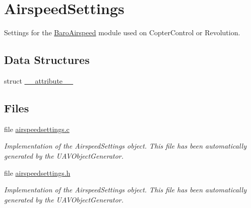 \hypertarget{group___airspeed_settings}{\section{\-Airspeed\-Settings}
\label{group___airspeed_settings}
}


\-Settings for the \hyperlink{group___baro_airspeed}{\-Baro\-Airspeed} module used on \-Copter\-Control or \-Revolution.  


\subsection*{\-Data \-Structures}
\begin{DoxyCompactItemize}
\item 
struct \hyperlink{struct____attribute____}{\-\_\-\-\_\-attribute\-\_\-\-\_\-}
\end{DoxyCompactItemize}
\subsection*{\-Files}
\begin{DoxyCompactItemize}
\item 
file \hyperlink{airspeedsettings_8c}{airspeedsettings.\-c}
\begin{DoxyCompactList}\small\item\em \-Implementation of the \-Airspeed\-Settings object. \-This file has been automatically generated by the \-U\-A\-V\-Object\-Generator. \end{DoxyCompactList}\item 
file \hyperlink{airspeedsettings_8h}{airspeedsettings.\-h}
\begin{DoxyCompactList}\small\item\em \-Implementation of the \-Airspeed\-Settings object. \-This file has been automatically generated by the \-U\-A\-V\-Object\-Generator. \end{DoxyCompactList}\end{DoxyCompactItemize}
